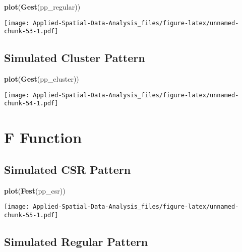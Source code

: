 \documentclass[
]{book}
\newenvironment{Shaded}{\begin{snugshade}}{\end{snugshade}}
\newcommand{\KeywordTok}[1]{\textcolor[rgb]{0.13,0.29,0.53}{\textbf{#1}}}
\newcommand{\NormalTok}[1]{#1}
\begin{document}
\begin{Shaded}
\begin{Highlighting}[]
\KeywordTok{plot}\NormalTok{(}\KeywordTok{Gest}\NormalTok{(pp_regular))}
\end{Highlighting}
\end{Shaded}

\texttt{[image: Applied-Spatial-Data-Analysis\_files/figure-latex/unnamed-chunk-53-1.pdf]}

\hypertarget{simulated-cluster-pattern-2}{%
\subsection{Simulated Cluster Pattern}\label{simulated-cluster-pattern-2}}

\begin{Shaded}
\begin{Highlighting}[]
\KeywordTok{plot}\NormalTok{(}\KeywordTok{Gest}\NormalTok{(pp_cluster))}
\end{Highlighting}
\end{Shaded}

\texttt{[image: Applied-Spatial-Data-Analysis\_files/figure-latex/unnamed-chunk-54-1.pdf]}

\hypertarget{f-function}{%
\section{F Function}\label{f-function}}

\hypertarget{simulated-csr-pattern-3}{%
\subsection{Simulated CSR Pattern}\label{simulated-csr-pattern-3}}

\begin{Shaded}
\begin{Highlighting}[]
\KeywordTok{plot}\NormalTok{(}\KeywordTok{Fest}\NormalTok{(pp_csr))}
\end{Highlighting}
\end{Shaded}

\texttt{[image: Applied-Spatial-Data-Analysis\_files/figure-latex/unnamed-chunk-55-1.pdf]}

\hypertarget{simulated-regular-pattern-3}{%
\subsection{Simulated Regular Pattern}\label{simulated-regular-pattern-3}}
\end{document}
